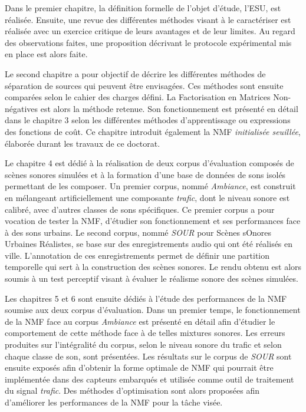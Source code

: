 Dans le premier chapitre, la définition formelle de l'objet d'étude, l'ESU, est réalisée. Ensuite, une revue des différentes méthodes visant à le caractériser est réalisée avec un exercice critique de leurs avantages et de leur limites. Au regard des observations faites, une proposition décrivant le protocole expérimental mis en place est alors faite.

Le second chapitre a pour objectif de décrire les différentes méthodes de séparation de sources qui peuvent être envisagées. Ces méthodes sont ensuite comparées selon le cahier des charges défini. La Factorisation en Matrices Non-négatives est alors la méthode retenue.
Son fonctionnement est présenté en détail dans le chapitre 3 selon les différentes méthodes d'apprentissage ou expressions des fonctions de coût. Ce chapitre introduit également la NMF \textit{initialisée seuillée}, élaborée durant les travaux de ce doctorat.

Le chapitre 4 est dédié à la réalisation de deux corpus d'évaluation composés de scènes sonores simulées et à la formation d'une base de données de sons isolés permettant de les composer.
Un premier corpus, nommé \textit{Ambiance}, est construit en mélangeant artificiellement une composante \textit{trafic}, dont le niveau sonore est calibré, avec d'autres classes de sons spécifiques. Ce premier corpus a pour vocation de tester la NMF, d'étudier son fonctionnement et ses performances face à des sons urbains.
Le second corpus, nommé \textit{SOUR} pour Scènes sOnores Urbaines Réalistes, se base sur des enregistrements audio qui ont été réalisés en ville.
L'annotation de ces enregistrements permet de définir une partition temporelle qui sert à la construction des scènes sonores. Le rendu obtenu est alors soumis à un test perceptif visant à évaluer le réalisme sonore des scènes simulées.

Les chapitres 5 et 6 sont ensuite dédiés à l'étude des performances de la NMF soumise aux deux corpus d'évaluation. Dans un premier temps, le fonctionnement de la NMF face au corpus \textit{Ambiance} est présenté en détail afin d'étudier le comportement de cette méthode face à de telles mixtures sonores. Les erreurs produites sur l'intégralité du corpus, selon le niveau sonore du trafic et selon chaque classe de son, sont présentées.
Les résultats sur le corpus de \textit{SOUR} sont ensuite exposés afin d'obtenir la forme optimale de NMF qui pourrait être implémentée dans des capteurs embarqués et utilisée comme outil de traitement du signal \textit{trafic}. Des méthodes d'optimisation sont alors proposées afin d'améliorer les performances de la NMF pour la tâche visée.
